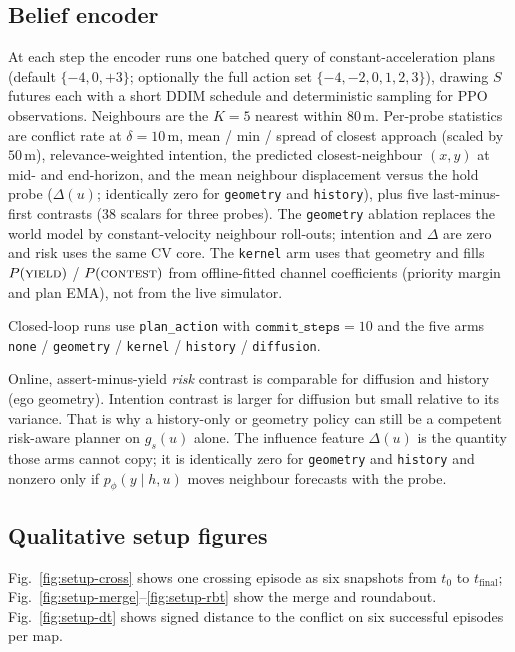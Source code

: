 \documentclass[conference]{IEEEtran}
\newcommand{\yield}{\textsc{yield}}
\newcommand{\contest}{\textsc{contest}}
\begin{document}
\subsection{Belief encoder}

At each step the encoder runs one batched query of constant-acceleration
plans (default $\{-4, 0, +3\}$; optionally the full action set
$\{-4,-2,0,1,2,3\}$), drawing $S$ futures each with a short DDIM schedule and
deterministic sampling for PPO observations. Neighbours are the $K{=}5$ nearest
within $80$\,m. Per-probe statistics are conflict rate at $\delta = 10$\,m,
mean / min / spread of closest approach (scaled by $50$\,m), relevance-weighted
intention, the predicted closest-neighbour $(x,y)$ at mid- and end-horizon, and
the mean neighbour displacement versus the hold probe ($\Delta(u)$; identically
zero for \texttt{geometry} and \texttt{history}), plus five last-minus-first
contrasts ($38$ scalars for three probes). The \texttt{geometry} ablation
replaces the world model by constant-velocity neighbour roll-outs; intention and
$\Delta$ are zero and risk uses the same CV core. The \texttt{kernel} arm uses
that geometry and fills $P(\yield)$ / $P(\contest)$ from offline-fitted
channel coefficients (priority margin and plan EMA), not from the live
simulator.

Closed-loop runs use \texttt{plan\_action} with
$\texttt{commit\_steps}=10$ and the five arms
\texttt{none} / \texttt{geometry} / \texttt{kernel} / \texttt{history} /
\texttt{diffusion}.

Online, assert-minus-yield \emph{risk} contrast is comparable for diffusion and
history (ego geometry). Intention contrast is larger for diffusion but small
relative to its variance. That is why a history-only or geometry policy can still
be a competent risk-aware planner on $g_s(u)$ alone. The influence feature
$\Delta(u)$ is the quantity those arms cannot copy; it is identically zero for
\texttt{geometry} and \texttt{history} and nonzero only if $p_\phi(y\mid h,u)$
moves neighbour forecasts with the probe.

\subsection{Qualitative setup figures}

Fig.~\ref{fig:setup-cross} shows one crossing episode as six snapshots from
$t_0$ to $t_{\mathrm{final}}$; Fig.~\ref{fig:setup-merge}--\ref{fig:setup-rbt}
show the merge and roundabout. Fig.~\ref{fig:setup-dt} shows signed distance
to the conflict on six successful episodes per map.
\end{document}
